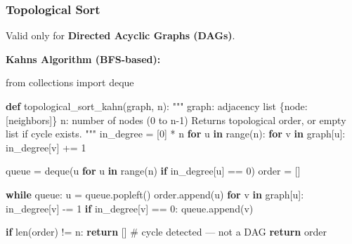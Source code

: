 \documentclass[11pt]{article}
\newenvironment{Shaded}{\begin{snugshade}}{\end{snugshade}}
\newcommand{\BuiltInTok}[1]{\textcolor[rgb]{0.50,0.55,0.55}{#1}}
\newcommand{\CommentTok}[1]{\textcolor[rgb]{0.48,0.49,0.49}{#1}}
\newcommand{\ControlFlowTok}[1]{\textcolor[rgb]{0.99,0.74,0.29}{\textbf{#1}}}
\newcommand{\DecValTok}[1]{\textcolor[rgb]{0.96,0.45,0.00}{#1}}
\newcommand{\ImportTok}[1]{\textcolor[rgb]{0.15,0.68,0.38}{#1}}
\newcommand{\KeywordTok}[1]{\textcolor[rgb]{0.81,0.81,0.76}{\textbf{#1}}}
\newcommand{\NormalTok}[1]{\textcolor[rgb]{0.81,0.81,0.76}{#1}}
\newcommand{\OperatorTok}[1]{\textcolor[rgb]{0.81,0.81,0.76}{#1}}
\begin{document}
\subsubsection{Topological Sort}\label{topological-sort}

Valid only for \textbf{Directed Acyclic Graphs (DAGs)}.

\textbf{Kahn\textquotesingle s Algorithm (BFS-based):}


\begin{Shaded}
\begin{Highlighting}[]
\ImportTok{from}\NormalTok{ collections }\ImportTok{import}\NormalTok{ deque}

\KeywordTok{def}\NormalTok{ topological\_sort\_kahn(graph, n):}
    \CommentTok{"""}
\CommentTok{    graph: adjacency list \{node: [neighbors]\}}
\CommentTok{    n: number of nodes (0 to n{-}1)}
\CommentTok{    Returns topological order, or empty list if cycle exists.}
\CommentTok{    """}
\NormalTok{    in\_degree }\OperatorTok{=}\NormalTok{ [}\DecValTok{0}\NormalTok{] }\OperatorTok{*}\NormalTok{ n}
    \ControlFlowTok{for}\NormalTok{ u }\KeywordTok{in} \BuiltInTok{range}\NormalTok{(n):}
        \ControlFlowTok{for}\NormalTok{ v }\KeywordTok{in}\NormalTok{ graph[u]:}
\NormalTok{            in\_degree[v] }\OperatorTok{+=} \DecValTok{1}

\NormalTok{    queue }\OperatorTok{=}\NormalTok{ deque(u }\ControlFlowTok{for}\NormalTok{ u }\KeywordTok{in} \BuiltInTok{range}\NormalTok{(n) }\ControlFlowTok{if}\NormalTok{ in\_degree[u] }\OperatorTok{==} \DecValTok{0}\NormalTok{)}
\NormalTok{    order }\OperatorTok{=}\NormalTok{ []}

    \ControlFlowTok{while}\NormalTok{ queue:}
\NormalTok{        u }\OperatorTok{=}\NormalTok{ queue.popleft()}
\NormalTok{        order.append(u)}
        \ControlFlowTok{for}\NormalTok{ v }\KeywordTok{in}\NormalTok{ graph[u]:}
\NormalTok{            in\_degree[v] }\OperatorTok{{-}=} \DecValTok{1}
            \ControlFlowTok{if}\NormalTok{ in\_degree[v] }\OperatorTok{==} \DecValTok{0}\NormalTok{:}
\NormalTok{                queue.append(v)}

    \ControlFlowTok{if} \BuiltInTok{len}\NormalTok{(order) }\OperatorTok{!=}\NormalTok{ n:}
        \ControlFlowTok{return}\NormalTok{ []  }\CommentTok{\# cycle detected — not a DAG}
    \ControlFlowTok{return}\NormalTok{ order}
\end{Highlighting}
\end{Shaded}
\end{document}

